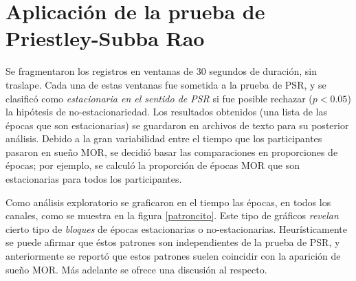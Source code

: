 
\section{Aplicación de la prueba de Priestley-Subba Rao}

Se fragmentaron los registros en ventanas de 30 segundos de duración, sin traslape. Cada una de 
estas ventanas fue sometida a la prueba de PSR, y se clasificó como \textit{estacionaria en el 
sentido de PSR} si fue posible rechazar ($p<0.05$) la hipótesis de no-estacionariedad. 
%
Los resultados obtenidos (una lista de las épocas que son estacionarias) se guardaron en archivos 
de texto para su posterior análisis. 
%
Debido a la gran variabilidad entre el tiempo que los participantes pasaron en sueño MOR, se decidió
basar las comparaciones en proporciones de épocas; por ejemplo, se calculó la proporción de
épocas MOR que son estacionarias para todos los participantes.


Como análisis exploratorio se graficaron en el tiempo las épocas, en todos los canales, como se 
muestra en la figura \ref{patroncito}. Este tipo de gráficos \textit{revelan} cierto tipo de 
\textit{bloques} de épocas estacionarias o no-estacionarias. Heurísticamente se puede afirmar que 
éstos patrones son independientes de la prueba de PSR, y anteriormente se reportó que estos patrones
suelen coincidir con la aparición de sueño MOR. Más adelante se ofrece una discusión al 
respecto.

